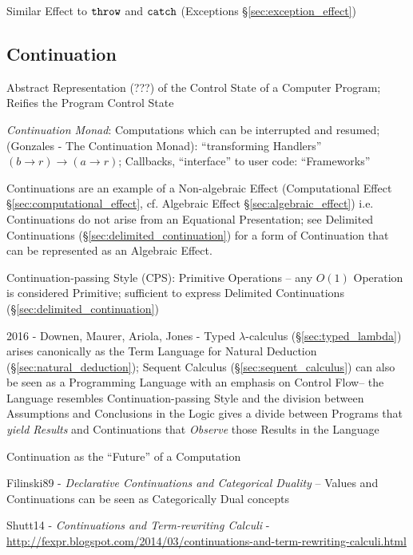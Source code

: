 \fist Similar Effect to $\mathtt{throw}$ and $\mathtt{catch}$ (Exceptions
\S\ref{sec:exception_effect})



\subsection{Continuation}\label{sec:continuation}

Abstract Representation (???) of the Control State of a Computer
Program; Reifies the Program Control State

\emph{Continuation Monad}: Computations which can be interrupted and
resumed; (Gonzales - The Continuation Monad): ``transforming
Handlers'' $(b \rightarrow r) \rightarrow (a \rightarrow r)$;
Callbacks, ``interface'' to user code: ``Frameworks''

Continuations are an example of a Non-algebraic Effect (Computational
Effect \S\ref{sec:computational_effect}, cf. Algebraic Effect
\S\ref{sec:algebraic_effect}) i.e. Continuations do not arise from an
Equational Presentation; see Delimited Continuations
(\S\ref{sec:delimited_continuation}) for a form of Continuation that
can be represented as an Algebraic Effect.

Continuation-passing Style (CPS): Primitive Operations -- any $O(1)$
Operation is considered Primitive; sufficient to express Delimited
Continuations (\S\ref{sec:delimited_continuation})

2016 - Downen, Maurer, Ariola, Jones - Typed $\lambda$-calculus
(\S\ref{sec:typed_lambda}) arises canonically as the Term Language for Natural
Deduction (\S\ref{sec:natural_deduction}); Sequent Calculus
(\S\ref{sec:sequent_calculus}) can also be seen as a Programming Language with
an emphasis on Control Flow-- the Language resembles Continuation-passing Style
and the division between Assumptions and Conclusions in the Logic gives a
divide between Programs that \emph{yield Results} and Continuations that
\emph{Observe} those Results in the Language


Continuation as the ``Future'' of a Computation

Filinski89 - \emph{Declarative Continuations and Categorical Duality} --
Values and Continuations can be seen as Categorically Dual concepts

Shutt14 - \emph{Continuations and Term-rewriting Calculi} -
\url{http://fexpr.blogspot.com/2014/03/continuations-and-term-rewriting-calculi.html}


